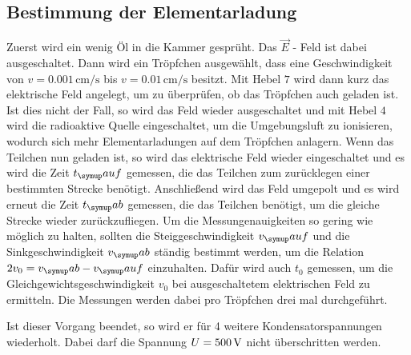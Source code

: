 \subsection{Bestimmung der Elementarladung}
Zuerst wird ein wenig Öl in die Kammer gesprüht. Das $\vec{E}$ - Feld ist dabei
ausgeschaltet. Dann wird ein Tröpfchen ausgewählt, dass eine Geschwindigkeit von
$v = 0.001\,\si{\centi\meter\per\second}$ bis $v = 0.01\,\si{\centi\meter\per\second}$
besitzt. Mit Hebel $7$ wird dann kurz das elektrische Feld angelegt, um zu überprüfen,
ob das Tröpfchen auch geladen ist. Ist dies nicht der Fall, so wird das Feld wieder
ausgeschaltet und mit Hebel $4$ wird die radioaktive Quelle eingeschaltet, um die
Umgebungsluft zu ionisieren, wodurch sich mehr Elementarladungen auf dem Tröpfchen
anlagern. Wenn das Teilchen nun geladen ist, so wird das elektrische Feld wieder
eingeschaltet und es wird die Zeit $t_\su{auf}$ gemessen, die das Teilchen zum zurücklegen einer
bestimmten Strecke benötigt. Anschließend wird das Feld umgepolt und es wird erneut
die Zeit $t_\su{ab}$ gemessen, die das Teilchen benötigt, um die gleiche Strecke wieder
zurückzufliegen. Um die Messungenauigkeiten so gering wie möglich zu halten, sollten die
Steiggeschwindigkeit $v_\su{auf}$ und die Sinkgeschwindigkeit $v_\su{ab}$ ständig
bestimmt werden, um die Relation $2v_0 = v_\su{ab}-v_\su{auf}$ einzuhalten.
Dafür wird auch $t_0$ gemessen, um die Gleichgewichtsgeschwindigkeit $v_0$ bei
ausgeschaltetem elektrischen Feld zu ermitteln.
Die Messungen werden dabei pro 
Tröpfchen drei mal durchgeführt.

Ist dieser Vorgang beendet, so wird er für 4 weitere Kondensatorspannungen
wiederholt. Dabei darf die Spannung $U=500\,\si{\volt}$ nicht überschritten werden.
